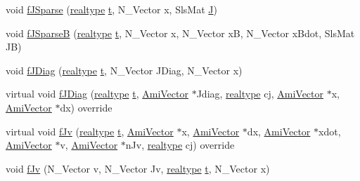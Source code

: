 \begin{DoxyCompactItemize}
\item 
void \mbox{\hyperlink{classamici_1_1_model___o_d_e_a741ef44fe870908155c0e59bb1a6c059}{f\+J\+Sparse}} (\mbox{\hyperlink{namespaceamici_a1bdce28051d6a53868f7ccbf5f2c14a3}{realtype}} \mbox{\hyperlink{classamici_1_1_model_a711281d57e9710226face29151cc4641}{t}}, N\+\_\+\+Vector x, Sls\+Mat \mbox{\hyperlink{classamici_1_1_model_a71cc1d93543998249a172328e1a4dbcd}{J}})
\item 
void \mbox{\hyperlink{classamici_1_1_model___o_d_e_a0e8a82c9c78706dddbe191d2ed6540a3}{f\+J\+SparseB}} (\mbox{\hyperlink{namespaceamici_a1bdce28051d6a53868f7ccbf5f2c14a3}{realtype}} \mbox{\hyperlink{classamici_1_1_model_a711281d57e9710226face29151cc4641}{t}}, N\+\_\+\+Vector x, N\+\_\+\+Vector xB, N\+\_\+\+Vector x\+Bdot, Sls\+Mat JB)
\item 
void \mbox{\hyperlink{classamici_1_1_model___o_d_e_a894cb7158f20a976348caa9d73520d40}{f\+J\+Diag}} (\mbox{\hyperlink{namespaceamici_a1bdce28051d6a53868f7ccbf5f2c14a3}{realtype}} \mbox{\hyperlink{classamici_1_1_model_a711281d57e9710226face29151cc4641}{t}}, N\+\_\+\+Vector J\+Diag, N\+\_\+\+Vector x)
\item 
virtual void \mbox{\hyperlink{classamici_1_1_model___o_d_e_a79269ef1a74e1ad9e313dce0e4220291}{f\+J\+Diag}} (\mbox{\hyperlink{namespaceamici_a1bdce28051d6a53868f7ccbf5f2c14a3}{realtype}} \mbox{\hyperlink{classamici_1_1_model_a711281d57e9710226face29151cc4641}{t}}, \mbox{\hyperlink{classamici_1_1_ami_vector}{Ami\+Vector}} $\ast$Jdiag, \mbox{\hyperlink{namespaceamici_a1bdce28051d6a53868f7ccbf5f2c14a3}{realtype}} cj, \mbox{\hyperlink{classamici_1_1_ami_vector}{Ami\+Vector}} $\ast$x, \mbox{\hyperlink{classamici_1_1_ami_vector}{Ami\+Vector}} $\ast$dx) override
\item 
virtual void \mbox{\hyperlink{classamici_1_1_model___o_d_e_a1a0549510cbe20e4d3c28bf77fc722ed}{f\+Jv}} (\mbox{\hyperlink{namespaceamici_a1bdce28051d6a53868f7ccbf5f2c14a3}{realtype}} \mbox{\hyperlink{classamici_1_1_model_a711281d57e9710226face29151cc4641}{t}}, \mbox{\hyperlink{classamici_1_1_ami_vector}{Ami\+Vector}} $\ast$x, \mbox{\hyperlink{classamici_1_1_ami_vector}{Ami\+Vector}} $\ast$dx, \mbox{\hyperlink{classamici_1_1_ami_vector}{Ami\+Vector}} $\ast$xdot, \mbox{\hyperlink{classamici_1_1_ami_vector}{Ami\+Vector}} $\ast$v, \mbox{\hyperlink{classamici_1_1_ami_vector}{Ami\+Vector}} $\ast$n\+Jv, \mbox{\hyperlink{namespaceamici_a1bdce28051d6a53868f7ccbf5f2c14a3}{realtype}} cj) override
\item 
void \mbox{\hyperlink{classamici_1_1_model___o_d_e_a01252ccb85bec7adbc88d12fce4fde05}{f\+Jv}} (N\+\_\+\+Vector v, N\+\_\+\+Vector Jv, \mbox{\hyperlink{namespaceamici_a1bdce28051d6a53868f7ccbf5f2c14a3}{realtype}} \mbox{\hyperlink{classamici_1_1_model_a711281d57e9710226face29151cc4641}{t}}, N\+\_\+\+Vector x)

\end{DoxyCompactItemize}

